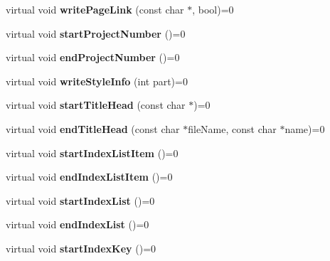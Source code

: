 \begin{DoxyCompactItemize}
virtual void {\bfseries write\+Page\+Link} (const char $\ast$, bool)=0
\item 
\mbox{\label{class_output_generator_aca2e001836d8cf6ae5e6d98bd9467b5b}} 
virtual void {\bfseries start\+Project\+Number} ()=0
\item 
\mbox{\label{class_output_generator_abb659e1d0c5d99f3a85751a321bca262}} 
virtual void {\bfseries end\+Project\+Number} ()=0
\item 
\mbox{\label{class_output_generator_ab3319043929bc785eeb2edfbeadc5088}} 
virtual void {\bfseries write\+Style\+Info} (int part)=0
\item 
\mbox{\label{class_output_generator_a2a88fa84eb821cbc46ebe77293db0564}} 
virtual void {\bfseries start\+Title\+Head} (const char $\ast$)=0
\item 
\mbox{\label{class_output_generator_a77b6fef939339086beec891ac1769781}} 
virtual void {\bfseries end\+Title\+Head} (const char $\ast$file\+Name, const char $\ast$name)=0
\item 
\mbox{\label{class_output_generator_a620605e68ebc9176a544eda7073bf039}} 
virtual void {\bfseries start\+Index\+List\+Item} ()=0
\item 
\mbox{\label{class_output_generator_ac4911ae06d09bc207a4e0f9da24516bc}} 
virtual void {\bfseries end\+Index\+List\+Item} ()=0
\item 
\mbox{\label{class_output_generator_adc617e6eaee65cfad74e0b8c07aab27d}} 
virtual void {\bfseries start\+Index\+List} ()=0
\item 
\mbox{\label{class_output_generator_af6f79555b9c01ffcf0d119d483271aa5}} 
virtual void {\bfseries end\+Index\+List} ()=0
\item 
\mbox{\label{class_output_generator_a6db4df81706e050d26df7083977e5da9}} 
virtual void {\bfseries start\+Index\+Key} ()=0
\item 
\mbox{\label{class_output_generator_a5c036e61acf5fe91e2372b16263fef5c}} 

\end{DoxyCompactItemize}
